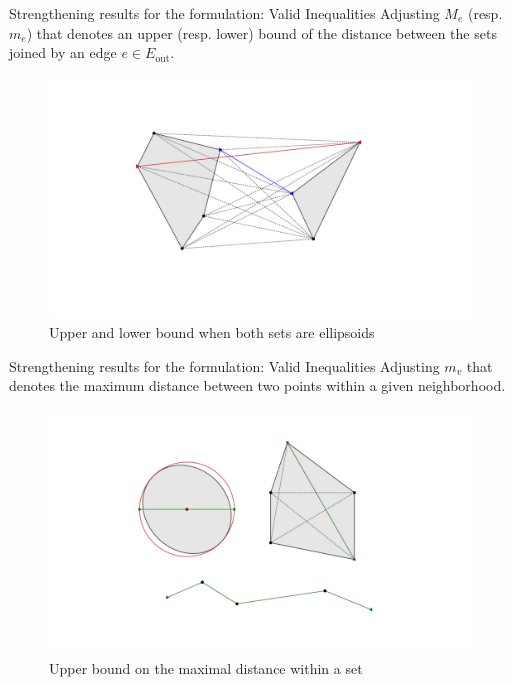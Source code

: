 \documentclass[slidestop,usepdftitle=false,10pt]{beamer}
\begin{document}
	\begin{frame}{Strengthening results for the formulation: Valid Inequalities}
        Adjusting $M_e$ (resp. $m_e$) that denotes an upper (resp. lower) bound of the distance between the sets joined by an edge $e \in E_{\text{out}}$.
        
        \begin{figure}
            \centering
            \includegraphics[width=0.7\linewidth]{bounds_polgon_polgon.png}
            \caption{Upper and lower bound when both sets are ellipsoids}
            \label{fig:boundsellipellip}
        \end{figure}
        
	\end{frame}
	
	\begin{frame}{Strengthening results for the formulation: Valid Inequalities}
        Adjusting $m_v$ that denotes the maximum distance between two points within a given neighborhood.
        
        \begin{figure}[h]
         \centering
         \includegraphics[width=0.7\linewidth]{bounds_inside}
         \caption{Upper bound on the maximal distance within a set}
         \label{fig:boundsinside}
        \end{figure}
            
	\end{frame}
	
\end{document}
